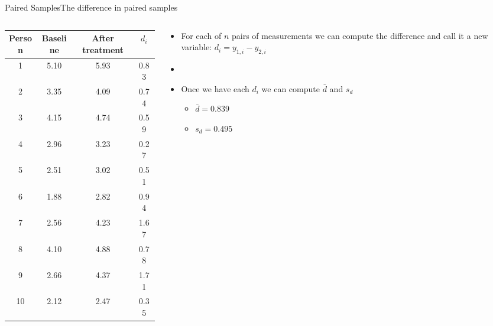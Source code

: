 \documentclass[xcolor=dvipsnames]{beamer}
\begin{document}
\begin{frame}{Paired Samples}{The difference in paired samples}
\begin{columns}
	\begin{column}{.5 \textwidth}
		{\scriptsize
			\begin{tabular}{|c|c|c|c|}
				\hline
				\textbf{Person} & \textbf{Baseline} &  \textbf{After treatment} & $d_i$ \\ \hline \hline
				1  &    5.10 &   5.93 &  0.83 \\ \hline 
				2  &    3.35 &   4.09 &  0.74 \\ \hline 
				3  &   4.15  &  4.74 &  0.59 \\ \hline 
				4  &   2.96  &  3.23 &  0.27 \\ \hline 
				5  &    2.51 &   3.02 &  0.51 \\ \hline 
				6  &   1.88  &  2.82 &  0.94 \\ \hline 
				7  &   2.56  &  4.23 &  1.67 \\ \hline 
				8  &    4.10 &   4.88 &  0.78 \\ \hline 
				9  &   2.66  &  4.37 &  1.71 \\ \hline 
				10  &    2.12  &  2.47 &  0.35 \\ \hline 
			\end{tabular}
		}
	\end{column}
	\begin{column}{.5 \textwidth}
			\begin{itemize}
			\item For each of $n$ pairs of measurements we can compute the difference and call it a new variable: $d_i = y_{1,i}-y_{2,i}$ \pause
			\item[]
			\item Once we have each $d_i$ we can compute $\bar{d}$ and $s_d$ \pause
			\begin{itemize}
				\item $\bar{d} = 0.839$ \pause
				\item $s_d = 0.495$
			\end{itemize}
		\end{itemize}
	\end{column}
\end{columns}
\end{frame}
\end{document}
